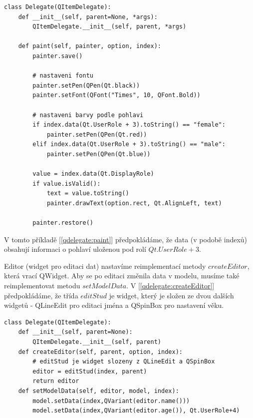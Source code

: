 \newpage
\begin{lstlisting}[label=qdelegate:paint,caption={Delegate - přepsání metody $paint$}, morekeywords={QItemDelegate, Qt, QFont, AlignLeft, DisplayRole, UserRole, QPen}]
class Delegate(QItemDelegate):
    def __init__(self, parent=None, *args):
        QItemDelegate.__init__(self, parent, *args)

    def paint(self, painter, option, index):
        painter.save()       
        
        # nastaveni fontu
        painter.setPen(QPen(Qt.black))
        painter.setFont(QFont("Times", 10, QFont.Bold))
        
		# nastaveni barvy podle pohlavi
        if index.data(Qt.UserRole + 3).toString() == "female":
            painter.setPen(QPen(Qt.red))
        elif index.data(Qt.UserRole + 3).toString() == "male":
            painter.setPen(QPen(Qt.blue))

        value = index.data(Qt.DisplayRole)
        if value.isValid():
            text = value.toString()
            painter.drawText(option.rect, Qt.AlignLeft, text)
            
        painter.restore()
\end{lstlisting}

        
\noindent V tomto příkladě [\autoref{qdelegate:paint}] předpokládáme, že data (v podobě indexů) obsahují informaci o pohlaví uloženou pod rolí $Qt.UserRole + 3$.

Editor (widget pro editaci dat) nastavíme reimplementací metody
$createEditor$, která vrací QWidget. Aby se po editaci změnila data v
modelu, musíme také reimplementovat metodu $setModelData$. V
[\lstlistingname \ref{qdelegate:createEditor}] předpokládáme, že třída
$editStud$ je widget, který je složen ze dvou dalších widgetů -
QLineEdit pro editaci jména a QSpinBox pro nastavení věku. \\
\newpage
\begin{lstlisting}[label=qdelegate:createEditor,caption={Delegate - přepsání metod $createEditor$ a $setModelData$}, morekeywords={QItemDelegate, Qt, QFont, AlignLeft, DisplayRole, UserRole, QPen}]
class Delegate(QItemDelegate):
    def __init__(self, parent=None):
        QItemDelegate.__init__(self, parent)
    def createEditor(self, parent, option, index):
    	# editStud je widget slozeny z QLineEdit a QSpinBox
        editor = editStud(index, parent)
        return editor    
    def setModelData(self, editor, model, index):
        model.setData(index,QVariant(editor.name()))
        model.setData(index,QVariant(editor.age()), Qt.UserRole+4)
\end{lstlisting}

